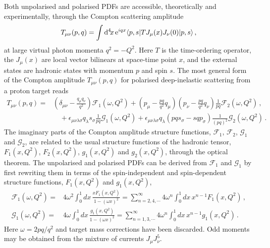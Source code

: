 Both unpolarised and polarised PDFs are accessible, theoretically and experimentally,
through the Compton scattering amplitude
\begin{equation}
\label{eq:Compton}
T_{\mu\nu}(p,q) = \int {\rm d}^4\!x\, {\rm e}^{iqx}  \langle p,s |T J_\mu(x) J_\nu(0)|p,s\rangle   \, ,
\end{equation}
at large virtual photon momenta $q^2=-Q^2$. Here $T$ is the time-ordering operator, the $J_\mu(x)$ are local vector bilinears at space-time point $x$, and the external states are hadronic states with momentum $p$ and spin $s$.
%
The most general form of the Compton amplitude $T_{\mu\nu}(p,q)$ for polarised deep-inelastic scattering from a proton target reads
\begin{align}
T_{\mu\nu}(p,q) = {} & \left(\delta_{\mu\nu}-\frac{q_\mu q_\nu}{q^2}\right) \mathcal{F}_1(\omega,Q^2) + \left(p_\mu-\frac{pq}{q^2}q_\mu\right) \left(p_\nu-\frac{pq}{q^2}q_\nu\right) \frac{1}{pq} \mathcal{F}_2(\omega,Q^2)\,,\\ 
& {} \quad  + \epsilon_{\mu\nu\lambda\sigma}q_\lambda s_\sigma \frac{1}{pq}\mathcal{G}_1(\omega,Q^2) + \epsilon_{\mu\nu\lambda\sigma}q_\lambda \left(pq s_\sigma - sq p_\sigma\right) \frac{1}{(pq)^2}\mathcal{G}_2(\omega,Q^2)\,.
\end{align}
The imaginary parts of the Compton amplitude structure functions, $\mathcal{F}_1$, $\mathcal{F}_2$, $\mathcal{G}_1$ and $\mathcal{G}_2$, are related to the usual structure functions of the hadronic tensor, $F_1(x,Q^2)$, $F_2(x,Q^2)$, $g_1(x,Q^2)$ and $g_2(x,Q^2)$, through the optical theorem.
%
The unpolarised and polarised PDFs can be derived from $\mathcal{F}_1$ and $\mathcal{G}_1$ by first rewriting them in terms of the spin-independent and spin-dependent structure functions, $F_1(x,Q^2)$ and $g_1(x,Q^2)$,
\begin{align}
\mathcal{F}_1(\omega,Q^2) = {} & 4 \omega^2 \int_0^1 dx\,  \frac{xF_1(x,Q^2)}{1-(\omega x)^2} = \sum_{n=2,4,\cdots}^\infty 4\omega^n \int_0^1 dx\, x^{n-1} F_1(x,Q^2) \,, \\
\mathcal{G}_1(\omega,Q^2) = {} & 4 \omega \int_0^1 dx\, \frac{g_1(x,Q^2)}{1-(\omega x)^2} = \sum_{n=1,3,\cdots}^\infty 4\omega^n \int_0^1 dx\, x^{n-1} g_1(x,Q^2)\,.
\end{align}
Here $\omega=2pq/q^2$ and target mass corrections have been discarded. Odd moments may be obtained from the mixture of currents $J_\mu J_\nu^5$.


